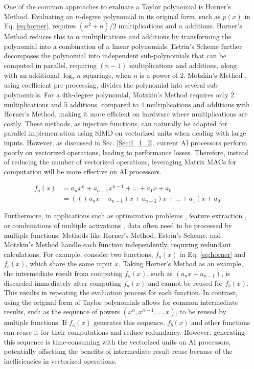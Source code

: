 One of the common approaches to evaluate a Taylor polynomial is Horner's Method. Evaluating an $n$-degree polynomial in its original form, such as $p(x)$ in Eq. \ref{eq:horner}, requires $(n^2 + n)/2$ multiplications and $n$ additions. Horner's Method reduces this to $n$ multiplications and additions by transforming the polynomial into a combination of $n$ linear polynomials. Estrin's Scheme \cite{DBLP:conf/aieeire/Estrin60} further decomposes the polynomial into independent sub-polynomials that can be computed in parallel, requiring $(n - 1)$ multiplications and additions, along with an additional $\log_2{n}$ squarings, when $n$ is a power of 2. Motzkin's Method \cite{motzkin1955evaluation}, using coefficient pre-processing, divides the polynomial into several sub-polynomials. For a 4th-degree polynomial, Motzkin's Method requires only 2 multiplications and 5 additions, compared to 4 multiplications and additions with Horner's Method, making it more efficient on hardware where multiplications are costly. These methods, as injective functions, can naturally be adapted for parallel implementation using SIMD on vectorized units when dealing with large inputs. However, as discussed in Sec. \ref{Sec:1_1_2}, current AI processors perform poorly on vectorized operations, leading to performance losses. Therefore, instead of reducing the number of vectorized operations, leveraging Matrix MACs for computation will be more effective on AI processors.

\begin{equation}
    \label{eq:horner}
    \begin{aligned}
    f_a(x) &= a_n x^n + a_{n - 1}x^{n - 1} + ... + a_1 x + a_0 \\
         &= (((a_n x + a_{n - 1}) x + a_{n - 2})x + ... + a_1) x + a_0 
    \end{aligned}
    \end{equation}

Furthermore, in applications such as optimization problems \cite{boyd2004convex}, feature extraction \cite{deller1993discrete}, or combinations of multiple activations \cite{DBLP:conf/icpr/ManessiR18}, data often need to be processed by multiple functions. Methods like Horner's Method, Estrin's Scheme, and Motzkin's Method handle each function independently, requiring redundant calculations. For example, consider two functions, $f_a(x)$ in Eq. \ref{eq:horner} and $f_b(x)$, which share the same input $x$. Taking Horner's Method as an example, the intermediate result from computing $f_a(x)$, such as $(a_nx + a_{n-1})$, is discarded immediately after computing $f_a(x)$ and cannot be reused for $f_b(x)$. This results in repeating the evaluation process for each function. In contrast, using the original form of Taylor polynomials allows for common intermediate results, such as the sequence of powers $(x^n, x^{n-1}, \ldots, x)$, to be reused by multiple functions. If $f_a(x)$ generates this sequence, $f_b(x)$ and other functions can reuse it for their computations and reduce redundancy. However, generating this sequence is time-consuming with the vectorized units on AI processors, potentially offsetting the benefits of intermediate result reuse because of the inefficiencies in vectorized operations.

